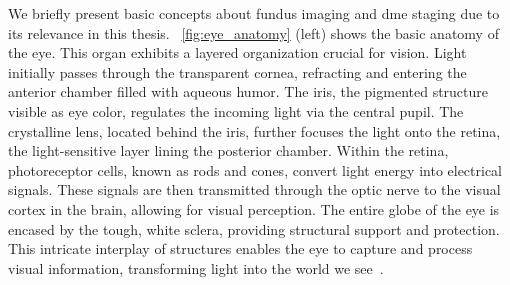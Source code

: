 We briefly present basic concepts about fundus imaging and \gls{dme} staging due to its relevance in this thesis. \fig~\ref{fig:eye_anatomy} (left) shows the basic anatomy of the eye. This organ exhibits a layered organization crucial for vision. Light initially passes through the transparent cornea, refracting and entering the anterior chamber filled with aqueous humor. The iris, the pigmented structure visible as eye color, regulates the incoming light via the central pupil. The crystalline lens, located behind the iris, further focuses the light onto the retina, the light-sensitive layer lining the posterior chamber. Within the retina, photoreceptor cells, known as rods and cones, convert light energy into electrical signals. These signals are then transmitted through the optic nerve to the visual cortex in the brain, allowing for visual perception. The entire globe of the eye is encased by the tough, white sclera, providing structural support and protection. This intricate interplay of structures enables the eye to capture and process visual information, transforming light into the world we see~\cite{zhu2012eye}.

